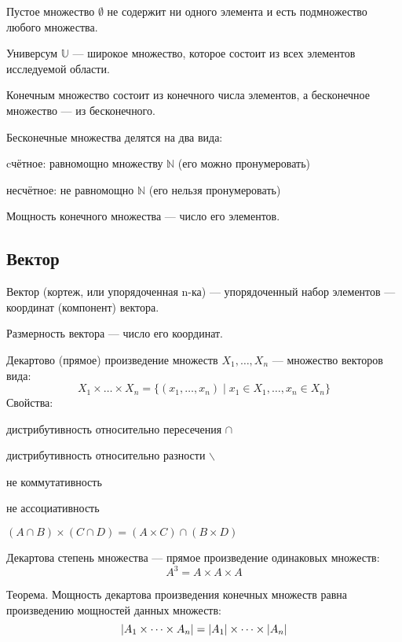 \begin{theorem}
{\bold Пустое множество} $\emptyset$ не содержит {\ital ни одного элемента} и есть подмножество любого множества.

{\bold Универсум} $\mathbb{U}$ --- широкое множество, которое состоит из всех элементов {\ital исследуемой области}.
\end{theorem}

{\bold Конечным} множество состоит из {\ital конечного} числа элементов, а {\bold бесконечное} множество --- из {\ital бесконечного}.

\begin{theorem}
{\ital Бесконечные} множества делятся на два вида:
\begin{list*}
\item {\bold cчётное}: равномощно множеству $\mathbb{N}$ {\ital\color{desc} (его можно пронумеровать)}
\item {\bold несчётное}: не равномощно $\mathbb{N}$ {\ital\color{desc} (его нельзя пронумеровать)}
\end{list*}
\end{theorem}

{\bold Мощность} {\ital конечного} множества --- число его элементов.

\subsection{Вектор}

{\bold Вектор} {\ital (кортеж, или упорядоченная n-ка)} --- упорядоченный набор элементов --- {\ital координат (компонент)} вектора.

{\bold Размерность} вектора --- число его координат.

\begin{theorem}
{\bold Декартово} {\ital (прямое)} {\bold произведение} множеств $X_1,\dots,X_n$ --- множество векторов вида:
$$X_1\times\dots\times X_n=\{(x_1,\dots,x_n)\mid x_1\in X_1,\dots,x_n\in X_n\}$$
Свойства:
\begin{list*}
\item дистрибутивность относительно {\ital пересечения} $\cap$
\item дистрибутивность относительно {\ital разности} $\backslash$
\item {\ital *не коммутативность}
\item {\ital *не ассоциативность}
\item $(A\cap B)\times(C\cap D)=(A\times C)\cap(B\times D)$
\end{list*}
\end{theorem}
{\bold Декартова степень} множества --- прямое произведение одинаковых множеств:
$$A^3=A\times A\times A$$
\begin{theorem}
{\bold Теорема.} Мощность декартова произведения конечных множеств равна {\ital произведению мощностей} данных множеств:
$$\left|A_1\times\dots\times A_n\right|=\left|A_1\right|\times\dots\times\left|A_n\right|$$
\end{theorem}

